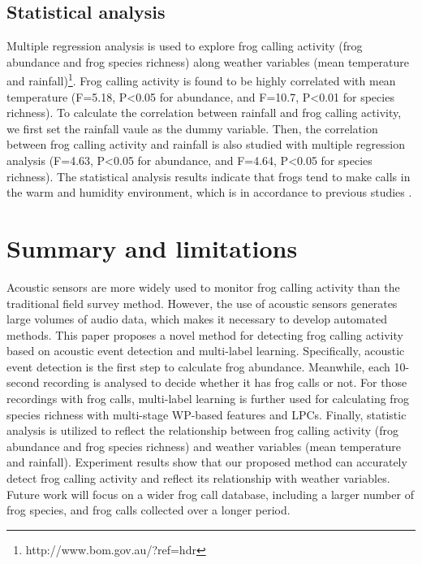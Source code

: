 \subsection{Statistical analysis}
Multiple regression analysis is used to explore frog calling activity (frog abundance and frog species richness) along weather variables (mean temperature and rainfall)\footnote[5] {http://www.bom.gov.au/?ref=hdr}. Frog calling activity is found to be highly correlated with mean temperature (F=5.18, P\textless0.05 for abundance, and F=10.7, P\textless0.01 for species richness). To calculate the correlation between rainfall and frog calling activity, we first set the rainfall vaule as the dummy variable. Then, the correlation between frog calling activity and rainfall is also studied with multiple regression analysis (F=4.63, P\textless0.05 for abundance, and F=4.64, P\textless0.05 for species richness). The statistical analysis results indicate that frogs tend to make calls in the warm and humidity environment, which is in accordance to previous studies \cite{akmentins2015patterns, canavero2008calling}.






\section{Summary and limitations}
Acoustic sensors are more widely used to monitor frog calling activity than the traditional field survey method. However, the use of acoustic sensors generates large volumes of audio data, which makes it necessary to develop automated methods. This paper proposes a novel method for detecting frog calling activity based on acoustic event detection and multi-label learning. Specifically,
acoustic event detection is the first step to calculate frog abundance. Meanwhile, each 10-second recording is analysed to decide whether it has frog calls or not. For those recordings with frog calls, multi-label learning is further used for calculating frog species richness with multi-stage WP-based features and LPCs. Finally, statistic analysis is utilized to reflect the relationship between frog calling activity (frog abundance and frog species richness) and weather variables (mean temperature and rainfall). Experiment results show that our proposed method can accurately detect frog calling activity and reflect its relationship with weather variables. Future work will focus on a wider frog call database, including a larger number of frog species, and frog calls collected over a longer period.



